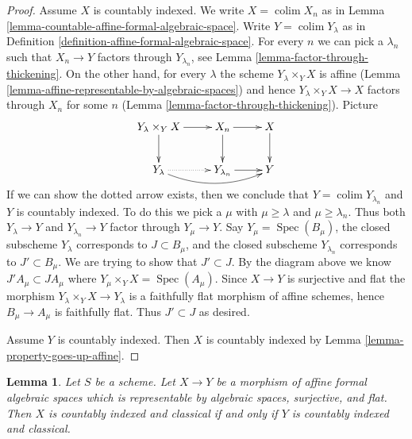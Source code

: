 \documentclass{stacks-project}
\theoremstyle{plain}
\newtheorem{lemma}[subsection]{Lemma}
\theoremstyle{definition}
\theoremstyle{remark}
\numberwithin{equation}{subsection}
\def\colim{\mathop{\mathrm{colim}}\nolimits}
\def\Spec{\mathop{\mathrm{Spec}}}
\begin{document}
\begin{proof}
Assume $X$ is countably indexed. We write $X = \colim X_n$ as in
Lemma \ref{lemma-countable-affine-formal-algebraic-space}.
Write $Y = \colim Y_\lambda$ as in
Definition \ref{definition-affine-formal-algebraic-space}.
For every $n$ we can pick a $\lambda_n$ such that
$X_n \to Y$ factors through $Y_{\lambda_n}$, see
Lemma \ref{lemma-factor-through-thickening}.
On the other hand, for every $\lambda$ the scheme
$Y_\lambda \times_Y X$ is affine
(Lemma \ref{lemma-affine-representable-by-algebraic-spaces})
and hence $Y_\lambda \times_Y X \to X$ factors through
$X_n$ for some $n$ (Lemma \ref{lemma-factor-through-thickening}).
Picture
$$
\xymatrix{
Y_\lambda \times_Y X \ar[r] \ar[d] & X_n \ar[r] \ar[d] & X \ar[d] \\
Y_\lambda \ar@{..>}[r] \ar@/_1pc/[rr] & Y_{\lambda_n} \ar[r] & Y
}
$$
If we can show the dotted arrow exists, then we conclude that
$Y = \colim Y_{\lambda_n}$ and $Y$ is countably indexed. To do this we
pick a $\mu$ with $\mu \geq \lambda$ and $\mu \geq \lambda_n$.
Thus both $Y_\lambda \to Y$ and $Y_{\lambda_n} \to Y$ factor
through $Y_\mu \to Y$.
Say $Y_\mu = \Spec(B_\mu)$, the closed subscheme $Y_\lambda$ corresponds to
$J \subset B_\mu$, and the closed subscheme $Y_{\lambda_n}$ corresponds to
$J' \subset B_\mu$. We are trying to show that $J' \subset J$.
By the diagram above we know $J'A_\mu \subset JA_\mu$
where $Y_\mu \times_Y X = \Spec(A_\mu)$.
Since $X \to Y$ is surjective and flat the morphism
$Y_\lambda \times_Y X \to Y_\lambda$ is a faithfully flat morphism
of affine schemes, hence $B_\mu \to A_\mu$ is
faithfully flat. Thus $J' \subset J$ as desired.

\medskip\noindent
Assume $Y$ is countably indexed. Then $X$ is countably indexed
by Lemma \ref{lemma-property-goes-up-affine}.
\end{proof}

\begin{lemma}
\label{lemma-iff-cic}
Let $S$ be a scheme. Let $X \to Y$ be a morphism of affine
formal algebraic spaces which is representable by algebraic spaces,
surjective, and flat. Then $X$ is countably indexed and classical
if and only if $Y$ is countably indexed and classical.
\end{lemma}
\end{document}

